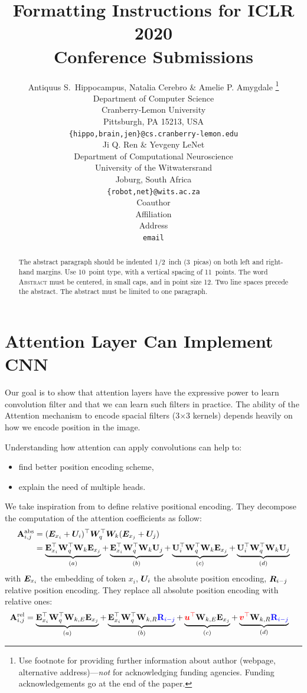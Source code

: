 \documentclass{article} %
\title{Formatting Instructions for ICLR 2020 \\ Conference Submissions}
\author{Antiquus S.~Hippocampus, Natalia Cerebro \& Amelie P. Amygdale \thanks{ Use footnote for providing further information
about author (webpage, alternative address)---\emph{not} for acknowledging
funding agencies.  Funding acknowledgements go at the end of the paper.} \\
Department of Computer Science\\
Cranberry-Lemon University\\
Pittsburgh, PA 15213, USA \\
\texttt{\{hippo,brain,jen\}@cs.cranberry-lemon.edu} \\
\And
Ji Q. Ren \& Yevgeny LeNet \\
Department of Computational Neuroscience \\
University of the Witwatersrand \\
Joburg, South Africa \\
\texttt{\{robot,net\}@wits.ac.za} \\
\AND
Coauthor \\
Affiliation \\
Address \\
\texttt{email}
}
\begin{document}
\maketitle

\begin{abstract}
The abstract paragraph should be indented 1/2~inch (3~picas) on both left and
right-hand margins. Use 10~point type, with a vertical spacing of 11~points.
The word \textsc{Abstract} must be centered, in small caps, and in point size 12. Two
line spaces precede the abstract. The abstract must be limited to one
paragraph.
\end{abstract}

\section{Attention Layer Can Implement CNN}

Our goal is to show that attention layers have the expressive power to learn 
convolution filter and that we can learn such filters in practice.
%
The ability of the Attention mechanism to encode spacial filters (3$\times$3 kernels) 
depends heavily on how we encode position in the image.


Understanding how attention can apply convolutions can help to:
\begin{itemize}
  \item find better position encoding scheme,
  \item explain the need of multiple heads.
\end{itemize}

We take inspiration from \citep[TransformerXL]{dai2019transformerxl} to define relative positional encoding.
They decompose the computation of the attention coefficients as follow:
\begin{align}
    \mathbf{A}_{i, j}^{\mathrm{abs}} &= ({\bm{E}}_{x_i} + {\bm{U}}_i)^\top {\bm{W}}_q^\top {\bm{W}}_k ({\bm{E}}_{x_j} + {\bm{U}}_j)\\
 &=
  \underbrace{\mathbf{E}_{x_{i}}^{\top} \mathbf{W}_{q}^{\top} \mathbf{W}_{k} \mathbf{E}_{x_{j}}}_{(a)} 
  +
  \underbrace{\mathbf{E}_{x_{i}}^{\top} \mathbf{W}_{q}^{\top} \mathbf{W}_{k} \mathbf{U}_{j}}_{(b)}
  +
  \underbrace{\mathbf{U}_{i}^{\top} \mathbf{W}_{q}^{\top} \mathbf{W}_{k} \mathbf{E}_{x_{j}}}_{(c)}
  +
  \underbrace{\mathbf{U}_{i}^{\top} \mathbf{W}_{q}^{\top} \mathbf{W}_{k} \mathbf{U}_{j}}_{(d)}
\end{align}
with ${\bm{E}}_{x_i}$ the embedding of token $x_i$, ${\bm{U}}_i$ the absolute position encoding, ${\bm{R}}_{i-j}$ relative position encoding. They replace all absolute position encoding with relative ones:
\begin{align}
  \mathbf{A}_{i, j}^{\mathrm{rel}} &=
  \underbrace{\mathbf{E}_{x_{i}}^{\top} \mathbf{W}_{q}^{\top} \mathbf{W}_{k, E} \mathbf{E}_{x_{j}}}_{(a)}
  +
  \underbrace{\mathbf{E}_{x_{i}}^{\top} \mathbf{W}_{q}^{\top} \mathbf{W}_{k, R} {\color{blue} \mathbf{R}_{i-j}}}_{(b)}
  +
  \underbrace{{\color{red} {\bm{u}}^{\top}} \mathbf{W}_{k, E} \mathbf{E}_{x_{j}}}_{(c)}
  +
  \underbrace{{\color{red} {\bm{v}}^{\top}} \mathbf{W}_{k, R} {\color{blue} \mathbf{R}_{i-j}}}_{(d)}
  \label{eq:att_rel}
\end{align}
\end{document}

